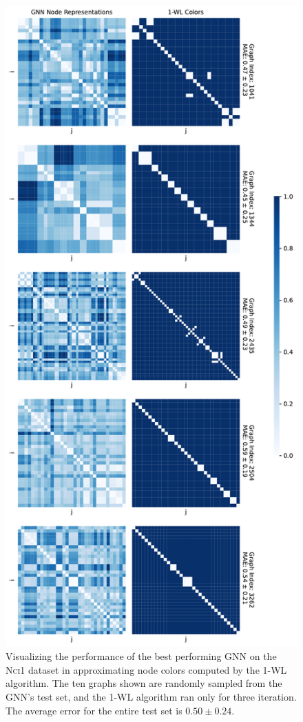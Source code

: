 \begin{figure}[!ht]
\begin{minipage}[b]{0.45992852703\textwidth}
    \end{minipage}
    \hfill
    \begin{minipage}[b]{0.53007147296\textwidth}
        \includegraphics[width=\textwidth, right]{Figures/heatmaps_NCI1_1.pdf}
    \end{minipage}
    \hfill
    \caption{Visualizing the performance of the best performing GNN on the \textsc{Nci1} dataset in approximating node colors computed by the 1-WL algorithm. The ten graphs shown are randomly sampled from the GNN's test set, and the 1-WL algorithm ran only for three iteration. The average error for the entire test set is $0.50 \pm 0.24$.}
    \label{fig:gnn_approx_nci_3}
\end{figure}


